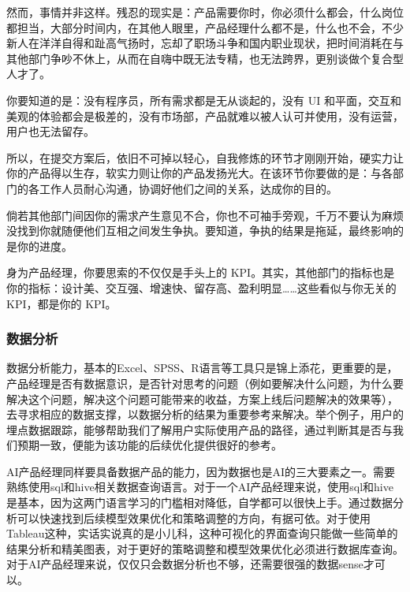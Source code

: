 \documentclass[letterpaper,11pt,english]{sphinxmanual}
\begin{document}
然而，事情并非这样。残忍的现实是：产品需要你时，你必须什么都会，什么岗位都担当，大部分时间内，在其他人眼里，产品经理什么都不是，什么也不会，不少新人在洋洋自得和趾高气扬时，忘却了职场斗争和国内职业现状，把时间消耗在与其他部门争吵不休上，从而在自嗨中既无法专精，也无法跨界，更别谈做个复合型人才了。

你要知道的是：没有程序员，所有需求都是无从谈起的，没有 UI
和平面，交互和美观的体验都会是极差的，没有市场部，产品就难以被人认可并使用，没有运营，用户也无法留存。

所以，在提交方案后，依旧不可掉以轻心，自我修炼的环节才刚刚开始，硬实力让你的产品得以生存，软实力则让你的产品发扬光大。在该环节你要做的是：与各部门的各工作人员耐心沟通，协调好他们之间的关系，达成你的目的。

倘若其他部门间因你的需求产生意见不合，你也不可袖手旁观，千万不要认为麻烦没找到你就随便他们互相之间发生争执。要知道，争执的结果是拖延，最终影响的是你的进度。

身为产品经理，你要思索的不仅仅是手头上的
KPI。其实，其他部门的指标也是你的指标：设计美、交互强、增速快、留存高、盈利明显……这些看似与你无关的
KPI，都是你的 KPI。


\subsubsection{数据分析}
\label{\detokenize{chapter_knowledge/data_analysis:data-analysis}}\label{\detokenize{chapter_knowledge/data_analysis:id1}}\label{\detokenize{chapter_knowledge/data_analysis::doc}}
数据分析能力，基本的Excel、SPSS、R语言等工具只是锦上添花，更重要的是，产品经理是否有数据意识，是否针对思考的问题（例如要解决什么问题，为什么要解决这个问题，解决这个问题可能带来的收益，方案上线后问题解决的效果等），去寻求相应的数据支撑，以数据分析的结果为重要参考来解决。举个例子，用户的埋点数据跟踪，能够帮助我们了解用户实际使用产品的路径，通过判断其是否与我们预期一致，便能为该功能的后续优化提供很好的参考。
%
\begin{footnote}[571]\sphinxAtStartFootnote
{}
%
\end{footnote}

AI产品经理同样要具备数据产品的能力，因为数据也是AI的三大要素之一。需要熟练使用sql和hive相关数据查询语言。对于一个AI产品经理来说，使用sql和hive是基本，因为这两门语言学习的门槛相对降低，自学都可以很快上手。通过数据分析可以快速找到后续模型效果优化和策略调整的方向，有据可依。对于使用Tableau这种，实话实说真的是小儿科，这种可视化的界面查询只能做一些简单的结果分析和精美图表，对于更好的策略调整和模型效果优化必须进行数据库查询。对于AI产品经理来说，仅仅只会数据分析也不够，还需要很强的数据sense才可以。
%
\begin{footnote}[572]\sphinxAtStartFootnote
{}
%
\end{footnote}
\end{document}
